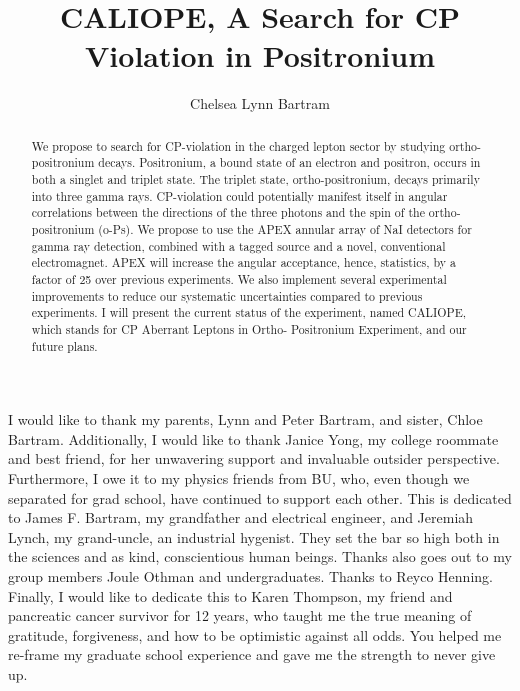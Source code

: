 \documentclass[openany, 12pt]{book}
\title{CALIOPE, A Search for CP Violation in Positronium
}
\author{Chelsea Lynn Bartram}
\begin{document}
\frontmatter

\maketitlepage

\makecopyrightpage

\begin{abstract}
  We propose to search for CP-violation in the charged lepton sector by studying ortho-positronium decays.
  Positronium, a bound state of an electron and positron, occurs in both a singlet and triplet state. The triplet
  state, ortho-positronium, decays primarily into three gamma rays. CP-violation could potentially manifest
  itself in angular correlations between the directions of the three photons and the spin of the ortho-positronium
  (o-Ps). We propose to use the APEX annular array of NaI detectors for gamma ray detection, combined
  with a tagged source and a novel, conventional electromagnet. APEX will increase the angular acceptance,
  hence, statistics, by a factor of 25 over previous experiments. We also implement several experimental
  improvements to reduce our systematic uncertainties compared to previous experiments. I will present
  the current status of the experiment, named CALIOPE, which stands for CP Aberrant Leptons in Ortho-
  Positronium Experiment, and our future plans.

\end{abstract}

\begin{acknowledgements}
  I would like to thank my parents, Lynn and Peter Bartram, and sister, Chloe Bartram. Additionally, I would like to thank Janice Yong, my college roommate and best friend, for her unwavering support and invaluable outsider perspective. Furthermore, I owe it to my physics friends from BU, who, even though we separated for grad school, have continued to support each other. 
  This is dedicated to James F. Bartram, my grandfather and electrical engineer, and Jeremiah Lynch, my grand-uncle, an industrial hygenist. They set the bar so high both in the sciences and as kind, conscientious human beings. 
  Thanks also goes out to my group members Joule Othman and undergraduates.
  Thanks to Reyco Henning.
  Finally, I would like to dedicate this to Karen Thompson, my friend and pancreatic cancer survivor for 12 years, who taught me the true meaning of gratitude, forgiveness, and how to be optimistic against all odds. You helped me re-frame my graduate school experience and gave me the strength to never give up.
\end{acknowledgements}
\end{document}
